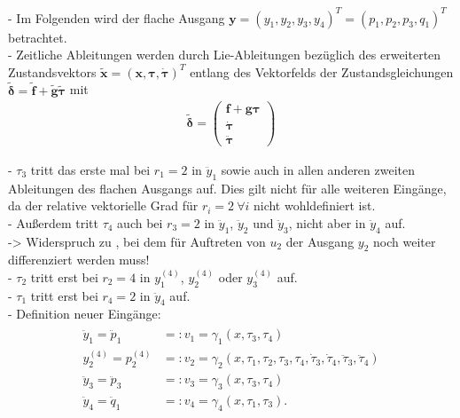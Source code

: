 - Im Folgenden wird der flache Ausgang $\mathbf{y} = (y_1, y_2, y_3, y_4)^T = (p_1, p_2, p_3, q_1)^T$ betrachtet. \\
- Zeitliche Ableitungen werden durch Lie-Ableitungen bezüglich des erweiterten Zustandsvektors $\mathbf{\tilde{x}} = (\mathbf{x}, \mathbf{\tau}, \mathbf{\dot{\tau}})^T$ entlang des Vektorfelds der Zustandsgleichungen $\mathbf{\tilde{\delta}} = \mathbf{\tilde{f}} + \mathbf{\tilde{g}} \mathbf{\tilde{\tau}}$ mit
\begin{align}
\mathbf{\tilde{\delta}} =
\left(\begin{matrix}
\mathbf{f} + \mathbf{g} \mathbf{\tau}\\
\dot{\mathbf{\tau}} \\
\ddot{\mathbf{\tau}}
\end{matrix}\right)
\end{align}

- $\tau_3$ tritt das erste mal bei $r_1 = 2$ in $\ddot{y}_1$ sowie auch in allen anderen zweiten Ableitungen des flachen Ausgangs auf. Dies gilt nicht für alle weiteren Eingänge, da der relative vektorielle Grad für $r_i = 2 \ \forall i$ nicht wohldefiniert ist. \\
- Außerdem tritt $\tau_4$ auch bei $r_3 = 2$ in $\ddot{y}_1$, $\ddot{y}_2$ und $\ddot{y}_3$, nicht aber in $\ddot{y}_4$ auf. \\
-> Widerspruch zu \cite[S. 206]{NLRT_Roebenack}, bei dem für Auftreten von  $u_2$ der Ausgang $y_2$ noch weiter differenziert werden muss! \\ 
- $\tau_2$ tritt erst bei $r_2 = 4$ in $y_1^{(4)}$, $y_2^{(4)}$ oder $y_3^{(4)}$ auf. \\
- $\tau_1$ tritt erst bei $r_4 = 2$ in $\ddot{y}_4$ auf. \\
- Definition neuer Eingänge:
\begin{align}
\begin{split}
	\ddot{y}_1 = \ddot{p}_1 &=: v_1 = \gamma_1(x, \tau_3, \tau_4) \\
	y_2^{(4)} = p_2^{(4)} &=: v_2 = \gamma_2(x, \tau_1, \tau_2, \tau_3, \tau_4, \dot{\tau}_3, \dot{\tau}_4, \ddot{\tau}_3, \ddot{\tau}_4) \\
	\ddot{y}_3 = \ddot{p}_3 &=: v_3 = \gamma_3(x, \tau_3, \tau_4) \\
	\ddot{y}_4 = \ddot{q}_1 &=: v_4 = \gamma_4(x, \tau_1, \tau_3) .
\end{split}
\end{align}

